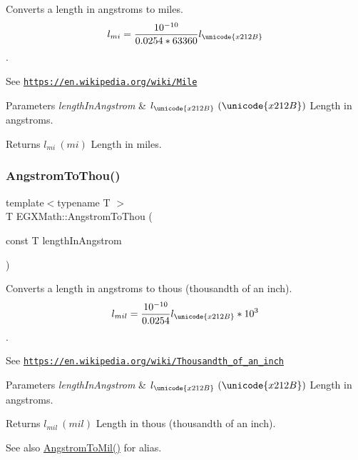 Converts a length in angstroms to miles. \[ l_{mi}=\frac{10^{-10}}{0.0254 * 63360} l_{\unicode{x212B}} \]. 

See \href{https://en.wikipedia.org/wiki/Mile}{\tt https\+://en.\+wikipedia.\+org/wiki/\+Mile} 
\begin{DoxyParams}{Parameters}
{\em length\+In\+Angstrom} & $ l_{\unicode{x212B}}\ (\unicode{x212B})$ Length in angstroms. \\
\hline
\end{DoxyParams}
\begin{DoxyReturn}{Returns}
$ l_{mi}\ (mi)$ Length in miles. 
\end{DoxyReturn}
\mbox{\label{group___e_g_x_math-_conversions-_length_conversions-_non-_s_i-_angstrom-_imperial_gafdf126044e17b0d3e0d83e510ba11990}} 
\subsubsection{\texorpdfstring{Angstrom\+To\+Thou()}{AngstromToThou()}}
{\footnotesize\ttfamily template$<$typename T $>$ \\
T E\+G\+X\+Math\+::\+Angstrom\+To\+Thou (\begin{DoxyParamCaption}\item[{const T}]{length\+In\+Angstrom }\end{DoxyParamCaption})}



Converts a length in angstroms to thous (thousandth of an inch). \[ l_{mil}= \frac{10^{-10}}{0.0254} l_{\unicode{x212B}} * 10^{3} \]. 

See \href{https://en.wikipedia.org/wiki/Thousandth_of_an_inch}{\tt https\+://en.\+wikipedia.\+org/wiki/\+Thousandth\+\_\+of\+\_\+an\+\_\+inch} 
\begin{DoxyParams}{Parameters}
{\em length\+In\+Angstrom} & $ l_{\unicode{x212B}}\ (\unicode{x212B})$ Length in angstroms. \\
\hline
\end{DoxyParams}
\begin{DoxyReturn}{Returns}
$ l_{mil}\ (mil)$ Length in thous (thousandth of an inch). 
\end{DoxyReturn}
\begin{DoxySeeAlso}{See also}
\mbox{\hyperlink{group___e_g_x_math-_conversions-_length_conversions-_non-_s_i-_angstrom-_imperial_gae8d17e18786a104634ccfa6b9f46f314}{Angstrom\+To\+Mil()}} for alias. 
\end{DoxySeeAlso}
\mbox{\label{group___e_g_x_math-_conversions-_length_conversions-_non-_s_i-_angstrom-_imperial_ga57cb8a4219a83a504bf2ea1e7d250144}} 
